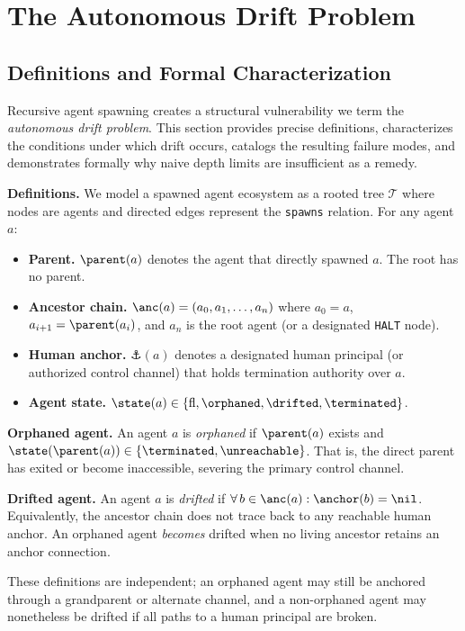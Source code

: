 \section{The Autonomous Drift Problem}

\subsection{Definitions and Formal Characterization}

Recursive agent spawning creates a structural vulnerability we term the \emph{autonomous drift problem}. This section provides precise definitions, characterizes the conditions under which drift occurs, catalogs the resulting failure modes, and demonstrates formally why naive depth limits are insufficient as a remedy.

\medskip
\noindent\textbf{Definitions.} We model a spawned agent ecosystem as a rooted tree $\mathcal{T}$ where nodes are agents and directed edges represent the \texttt{spawns} relation. For any agent $a$:

\begin{itemize}
  \item \textbf{Parent.} $\parent(a)$ denotes the agent that directly spawned $a$. The root has no parent.
  \item \textbf{Ancestor chain.} $\anc(a) = (a_0, a_1, \dots, a_n)$ where $a_0 = a$, $a_{i+1} = \parent(a_i)$, and $a_n$ is the root agent (or a designated \texttt{HALT} node).
  \item \textbf{Human anchor.} $\anchor(a)$ denotes a designated human principal (or authorized control channel) that holds termination authority over $a$.
  \item \textbf{Agent state.} $\state(a) \in \{\active, \orphaned, \drifted, \terminated\}$.
\end{itemize}

\medskip
\noindent\textbf{Orphaned agent.} An agent $a$ is \emph{orphaned} if $\parent(a)$ exists and $\state(\parent(a)) \in \{\terminated, \unreachable\}$. That is, the direct parent has exited or become inaccessible, severing the primary control channel.

\medskip
\noindent\textbf{Drifted agent.} An agent $a$ is \emph{drifted} if $\forall\, b \in \anc(a): \anchor(b) = \nil$. Equivalently, the ancestor chain does not trace back to any reachable human anchor. An orphaned agent \emph{becomes} drifted when no living ancestor retains an anchor connection.

These definitions are independent; an orphaned agent may still be anchored through a grandparent or alternate channel, and a non-orphaned agent may nonetheless be drifted if all paths to a human principal are broken.

